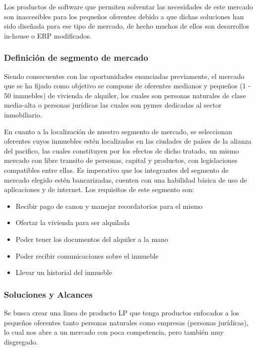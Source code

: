 \documentclass[letterpaper]{article}
\begin{document}
Los productos de software que permiten solventar las necesidades de este mercado son inaccesibles para los pequeños oferentes debido a que dichas soluciones han sido diseñada para ese tipo de mercado, de hecho muchos de ellos son desarrollos in-house o ERP modificados.


\subsubsection{Definición de segmento de mercado}

Siendo consecuentes con las oportunidades enunciadas previamente, el mercado que se ha fijado como objetivo se compone de oferentes medianos y pequeños (1 - 50 inmuebles) de vivienda de alquiler, los cuales son personas naturales de clase media-alta o personas jurídicas las cuales son pymes dedicadas al sector inmobiliario.

En cuanto a la localización de nuestro segmento de mercado, se seleccionan oferentes cuyos inmuebles estén localizados en las ciudades de países de la alianza del pacifico, las cuales constituyen por los efectos de dicho tratado, un mismo mercado con libre transito de personas, capital y productos, con legislaciones compatibles entre ellas. Es imperativo que los integrantes del segmento de mercado elegido estén bancarizadas, cuenten con una habilidad básica de uso de aplicaciones y de internet. Los requisitos de este segmento son:

\begin{itemize}
    \item Recibir pago de canon y manejar recordatorios para el mismo
    \item Ofertar la vivienda para ser alquilada
    \item Poder tener los documentos del alquiler a la mano
    \item Poder recibir comunicaciones sobre el inmueble
    \item Llevar un historial del inmueble
\end{itemize}

\subsubsection{Soluciones y Alcances}

Se busca crear una linea de producto LP que tenga productos enfocados a los pequeños oferentes tanto personas naturales como empresas (personas jurídicas), lo cual nos abre a un mercado con poca competencia, pero también muy disgregado.
\end{document}
